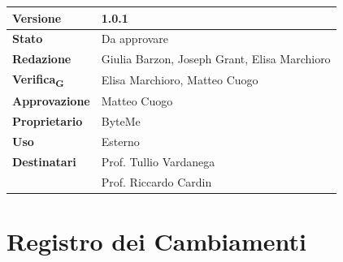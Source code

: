 \documentclass[11pt,a4paper]{article}
\newcommand{\gls}[1]{#1\textsubscript{G}}
\begin{document}
\begin{titlepage}
    \begin{table}[H]
        \centering
        \begin{tabular}{|l|p{5cm}|}
            \hline
            \textbf{Versione} & 1.0.1 \\
            \hline
            \textbf{Stato} & Da approvare \\
            \hline
            \textbf{Redazione} & Giulia Barzon, Joseph Grant, Elisa Marchioro \\
            \hline
            \textbf{\gls{Verifica}} & Elisa Marchioro, Matteo Cuogo \\
            \hline
            \textbf{Approvazione} & Matteo Cuogo \\
            \hline
            \textbf{Proprietario} & ByteMe \\
            \hline
            \textbf{Uso} & Esterno \\
            \hline
            \textbf{Destinatari} & Prof. Tullio Vardanega \\ & Prof. Riccardo Cardin \\
            \hline
        \end{tabular}
    \end{table}
    
    \vfill
\end{titlepage}

\section*{Registro dei Cambiamenti}
\end{document}
